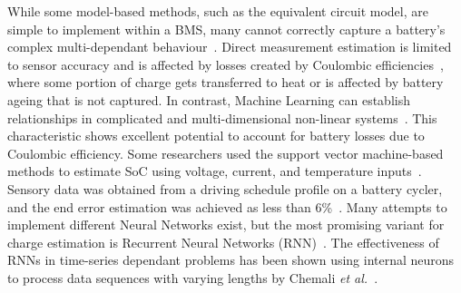 %
While some model-based methods, such as the equivalent circuit model, are simple to implement within a BMS, many cannot correctly capture a battery's complex multi-dependant behaviour~\cite{6953745}.
Direct measurement estimation is limited to sensor accuracy and is affected by losses created by Coulombic efficiencies~\cite{Smith_2010}, where some portion of charge gets transferred to heat or is affected by battery ageing that is not captured.
%
In contrast, Machine Learning can establish relationships in complicated and multi-dimensional non-linear systems~\cite{hansen_support_2005,anton_battery_2013,he_state_2014}.
This characteristic shows excellent potential to account for battery losses due to Coulombic efficiency.
Some researchers used the support vector machine-based methods to estimate SoC using voltage, current, and temperature inputs~\cite{hansen_support_2005,anton_battery_2013}.
Sensory data was obtained from a driving schedule profile on a battery cycler, and the end error estimation was achieved as less than 6\%~\cite{he_state_2014}.
Many attempts to implement different Neural Networks exist, but the most promising variant for charge estimation is Recurrent Neural Networks (RNN)~\cite{song_lithium-ion_2018, Chemali2017, mamo_long_2020, jiao_gru-rnn_2020, xiao_accurate_2019, javid_adaptive_2020, zhang_deep_2020}.
The effectiveness of RNNs in time-series dependant problems has been shown using internal neurons to process data sequences with varying lengths by Chemali \textit{et al.}~\cite{Chemali2017}.

